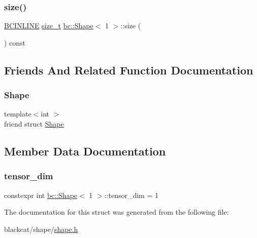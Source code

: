 \mbox{\label{structbc_1_1Shape_3_011_01_4_a883e87e59f07399bc4843d381bbd87be}} 
\subsubsection{\texorpdfstring{size()}{size()}}
{\footnotesize\ttfamily \hyperlink{common_8h_a6699e8b0449da5c0fafb878e59c1d4b1}{B\+C\+I\+N\+L\+I\+NE} \hyperlink{structbc_1_1Shape_3_011_01_4_a7ab1c3926651c49d726655dbaa5dc0a3}{size\+\_\+t} \hyperlink{structbc_1_1Shape}{bc\+::\+Shape}$<$ 1 $>$\+::size (\begin{DoxyParamCaption}{ }\end{DoxyParamCaption}) const\hspace{0.3cm}{\ttfamily [inline]}}



\subsection{Friends And Related Function Documentation}
\mbox{\label{structbc_1_1Shape_3_011_01_4_ab0bde87b11c5c08fec2f2325317820de}} 
\subsubsection{\texorpdfstring{Shape}{Shape}}
{\footnotesize\ttfamily template$<$int $>$ \\
friend struct \hyperlink{structbc_1_1Shape}{Shape}\hspace{0.3cm}{\ttfamily [friend]}}



\subsection{Member Data Documentation}
\mbox{\label{structbc_1_1Shape_3_011_01_4_ac2fac44ccf0120b2179e58fde3386678}} 
\subsubsection{\texorpdfstring{tensor\+\_\+dim}{tensor\_dim}}
{\footnotesize\ttfamily constexpr int \hyperlink{structbc_1_1Shape}{bc\+::\+Shape}$<$ 1 $>$\+::tensor\+\_\+dim = 1\hspace{0.3cm}{\ttfamily [static]}}



The documentation for this struct was generated from the following file\+:\begin{DoxyCompactItemize}
\item 
blackcat/shape/\hyperlink{shape_2shape_8h}{shape.\+h}\end{DoxyCompactItemize}
